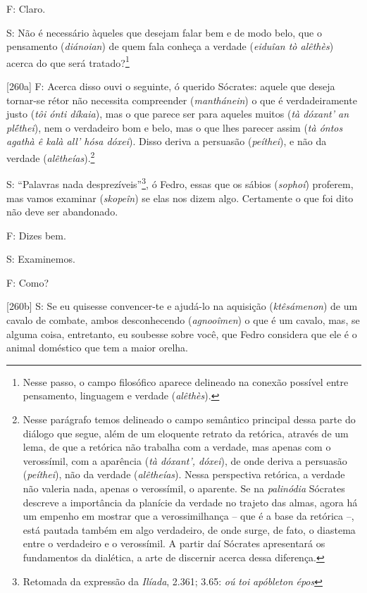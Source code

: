 F: Claro.

S: Não é necessário àqueles que desejam falar bem e de modo belo, que o
pensamento (\emph{diánoian}) de quem fala conheça a verdade
(\emph{eiduîan tò alêthès}) acerca do que será tratado?\footnote{Nesse
  passo, o campo filosófico aparece delineado na conexão possível entre
  pensamento, linguagem e verdade (\emph{alêthès}).}

{[}260a{]} F: Acerca disso ouvi o seguinte, ó querido Sócrates: aquele
que deseja tornar-se rétor não necessita compreender (\emph{manthánein})
o que é verdadeiramente justo (\emph{tôi ónti díkaia}), mas o que parece
ser para aqueles muitos (\emph{tà dóxant' an plḗthei}), nem o verdadeiro
bom e belo, mas o que lhes parecer assim (\emph{tà óntos agathà ê kalà
all' hósa dóxei}). Disso deriva a persuasão (\emph{peíthei}), e não da
verdade (\emph{alêtheías}).\footnote{Nesse parágrafo temos delineado o
  campo semântico principal dessa parte do diálogo que segue, além de um
  eloquente retrato da retórica, através de um lema, de que a retórica
  não trabalha com a verdade, mas apenas com o verossímil, com a
  aparência (\emph{tà dóxant', dóxei}), de onde deriva a persuasão
  (\emph{peíthei}), não da verdade (\emph{alêtheías}). Nessa perspectiva
  retórica, a verdade não valeria nada, apenas o verossímil, o aparente.
  Se na \emph{palinódia} Sócrates descreve a importância da planície da
  verdade no trajeto das almas, agora há um empenho em mostrar que a
  verossimilhança -- que é a base da retórica --, está pautada também em
  algo verdadeiro, de onde surge, de fato, o diastema entre o verdadeiro
  e o verossímil. A partir daí Sócrates apresentará os fundamentos da
  dialética, a arte de discernir acerca dessa diferença.}

S: ``Palavras nada desprezíveis''\footnote{Retomada da expressão da
  \emph{Ilíada}, 2.361; 3.65: \emph{oú} \emph{toi} \emph{apóbleton}
  \emph{épos}}, ó Fedro, essas que os sábios (\emph{sophoí}) proferem,
mas vamos examinar (\emph{skopeîn}) se elas nos dizem algo. Certamente o
que foi dito não deve ser abandonado.

F: Dizes bem.

S: Examinemos.

F: Como?

{[}260b{]} S: Se eu quisesse convencer-te e ajudá-lo na aquisição
(\emph{ktêsámenon}) de um cavalo de combate, ambos desconhecendo
(\emph{agnooîmen}) o que é um cavalo, mas, se alguma coisa, entretanto,
eu soubesse sobre você, que Fedro considera que ele é o animal doméstico
que tem a maior orelha.

